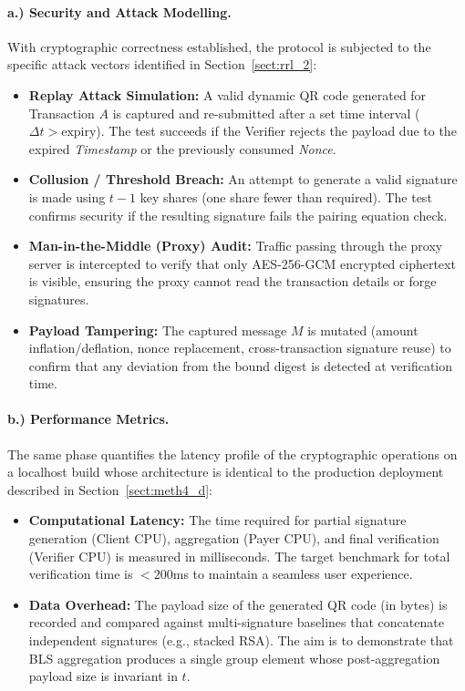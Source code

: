\documentclass[a4paper]{scl-article}
\begin{document}
\paragraph{a.) Security and Attack Modelling.}
With cryptographic correctness established, the protocol is subjected to the specific attack vectors identified in Section~\ref{sect:rrl_2}:
\begin{itemize}
    \item \textbf{Replay Attack Simulation:} A valid dynamic QR code generated for Transaction $A$ is captured and re-submitted after a set time interval ($\Delta t > \text{expiry}$). The test succeeds if the Verifier rejects the payload due to the expired \textit{Timestamp} or the previously consumed \textit{Nonce}.
    \item \textbf{Collusion / Threshold Breach:} An attempt to generate a valid signature is made using $t-1$ key shares (one share fewer than required). The test confirms security if the resulting signature fails the pairing equation check.
    \item \textbf{Man-in-the-Middle (Proxy) Audit:} Traffic passing through the proxy server is intercepted to verify that only AES-256-GCM encrypted ciphertext is visible, ensuring the proxy cannot read the transaction details or forge signatures.
    \item \textbf{Payload Tampering:} The captured message $M$ is mutated (amount inflation/deflation, nonce replacement, cross-transaction signature reuse) to confirm that any deviation from the bound digest is detected at verification time.
\end{itemize}

\paragraph{b.) Performance Metrics.}
The same phase quantifies the latency profile of the cryptographic operations on a localhost build whose architecture is identical to the production deployment described in Section~\ref{sect:meth4_d}:
\begin{itemize}
    \item \textbf{Computational Latency:} The time required for partial signature generation (Client CPU), aggregation (Payer CPU), and final verification (Verifier CPU) is measured in milliseconds. The target benchmark for total verification time is $<200$ms to maintain a seamless user experience.
    \item \textbf{Data Overhead:} The payload size of the generated QR code (in bytes) is recorded and compared against multi-signature baselines that concatenate independent signatures (e.g., stacked RSA). The aim is to demonstrate that BLS aggregation produces a single group element whose post-aggregation payload size is invariant in $t$.
\end{itemize}
\end{document}
